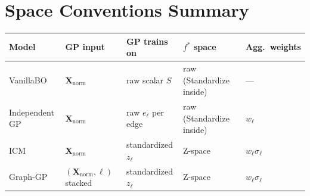 \documentclass[11pt]{article}
\begin{document}
\section{Space Conventions Summary}

\begin{center}
\begin{tabular}{lllll}
\toprule
Model & GP input & GP trains on & $f^*$ space & Agg.\ weights \\
\midrule
VanillaBO     & $\mathbf{X}_{\mathrm{norm}}$ & raw scalar $S$ & raw (Standardize inside) & — \\
Independent GP & $\mathbf{X}_{\mathrm{norm}}$ & raw $e_\ell$ per edge & raw (Standardize inside) & $w_\ell$ \\
ICM            & $\mathbf{X}_{\mathrm{norm}}$ & standardized $z_\ell$ & Z-space & $w_\ell\sigma_\ell$ \\
Graph-GP       & $(\mathbf{X}_{\mathrm{norm}}, \ell)$ stacked & standardized $z_\ell$ & Z-space & $w_\ell\sigma_\ell$ \\
\bottomrule
\end{tabular}
\end{center}
\end{document}
